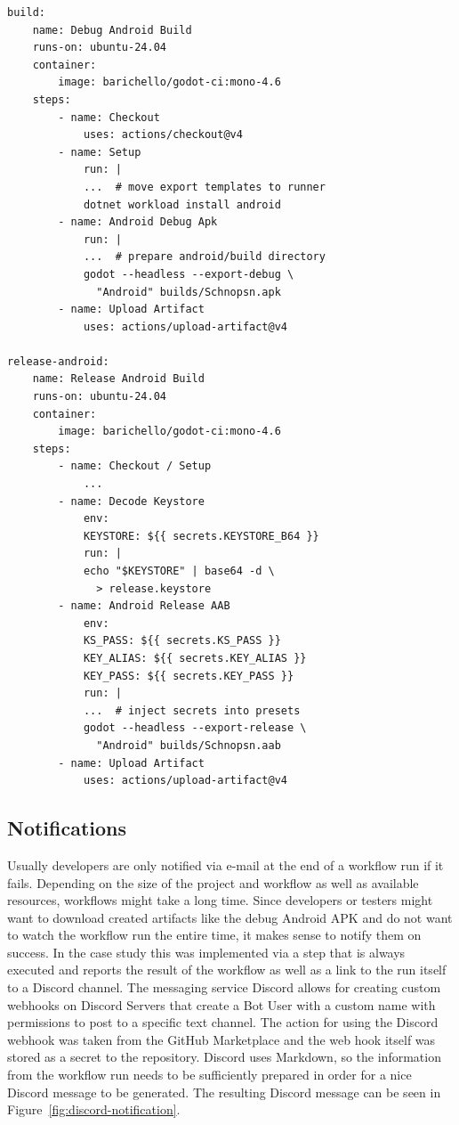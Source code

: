     {\footnotesize\begin{verbatim}
build:
    name: Debug Android Build
    runs-on: ubuntu-24.04
    container:
        image: barichello/godot-ci:mono-4.6
    steps:
        - name: Checkout
            uses: actions/checkout@v4
        - name: Setup
            run: |
            ...  # move export templates to runner
            dotnet workload install android
        - name: Android Debug Apk
            run: |
            ...  # prepare android/build directory
            godot --headless --export-debug \
              "Android" builds/Schnopsn.apk
        - name: Upload Artifact
            uses: actions/upload-artifact@v4

release-android:
    name: Release Android Build
    runs-on: ubuntu-24.04
    container:
        image: barichello/godot-ci:mono-4.6
    steps:
        - name: Checkout / Setup
            ...
        - name: Decode Keystore
            env:
            KEYSTORE: ${{ secrets.KEYSTORE_B64 }}
            run: |
            echo "$KEYSTORE" | base64 -d \
              > release.keystore
        - name: Android Release AAB
            env:
            KS_PASS: ${{ secrets.KS_PASS }}
            KEY_ALIAS: ${{ secrets.KEY_ALIAS }}
            KEY_PASS: ${{ secrets.KEY_PASS }}
            run: |
            ...  # inject secrets into presets
            godot --headless --export-release \
              "Android" builds/Schnopsn.aab
        - name: Upload Artifact
            uses: actions/upload-artifact@v4
\end{verbatim}}



\subsection{Notifications}

Usually developers are only notified via e-mail at the end of a workflow run if it fails. Depending on the size of the project and workflow as well as available resources, workflows might take a long time. Since developers or testers might want to download created artifacts like the debug Android APK and do not want to watch the workflow run the entire time, it makes sense to notify them on success. In the case study this was implemented via a step that is always executed and reports the result of the workflow as well as a link to the run itself to a Discord channel. The messaging service Discord allows for creating custom webhooks on Discord Servers that create a Bot User with a custom name with permissions to post to a specific text channel. The action for using the Discord webhook was taken from the GitHub Marketplace \cite{b13} and the web hook itself was stored as a secret to the repository. Discord uses Markdown, so the information from the workflow run needs to be sufficiently prepared in order for a nice Discord message to be generated.
The resulting Discord message can be seen in Figure~\ref{fig:discord-notification}.

